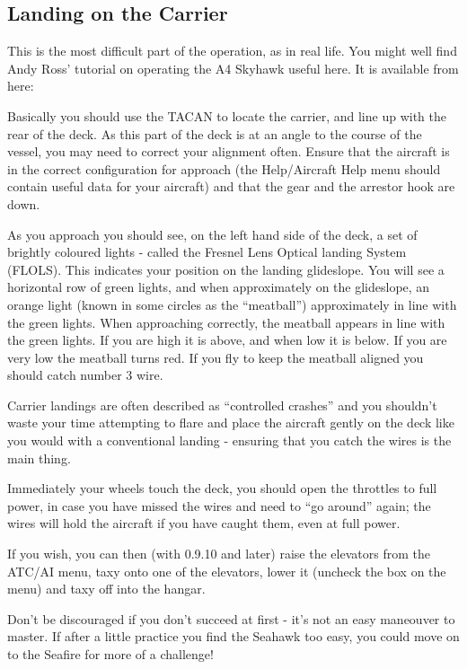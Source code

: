 \subsection{Landing on the Carrier}

This is the most difficult part of the operation, as in real life. You might well find Andy Ross' tutorial on 
operating the A4 Skyhawk useful here. It is available from here:

\noindent
{}

Basically you should use the TACAN to locate the carrier, and 
line up with the rear of the deck. As this part of the deck is at an angle to the course of the vessel, 
you may need to correct your alignment often. Ensure that the aircraft is in the correct configuration for 
approach (the Help/Aircraft Help menu should contain useful data for your aircraft) and that the gear and 
the arrestor hook are down.

As you approach you should see, on the left hand side of the deck, a set of brightly coloured lights - called 
the Fresnel Lens Optical landing System (FLOLS). This indicates your position on the landing glideslope. 
You will see a horizontal row of green lights, and when approximately on the glideslope, an orange light 
(known in some circles as the ``meatball'') approximately in line with the green lights. When approaching 
correctly, the meatball appears in line with the green lights. If you are high it is above, and when low 
it is below. If you are very low the meatball turns red. If you fly to keep the meatball aligned you 
should catch number 3 wire.

Carrier landings are often described as ``controlled crashes'' and you shouldn't waste your time attempting 
to flare and place the aircraft gently on the deck like you would with a conventional landing - ensuring that 
you catch the wires is the main thing.

Immediately your wheels touch the deck, you should open the throttles to full power, in case you have 
missed the wires and need to ``go around'' again; the wires will hold the aircraft if you have caught them, 
even at full power.

If you wish, you can then (with 0.9.10 and later) raise the elevators from the ATC/AI menu, taxy onto one of the elevators, 
lower it (uncheck the box on the menu) and taxy off into the hangar.

Don't be discouraged if you don't succeed at first - it's not an easy maneouver to master. If after a little 
practice you find the Seahawk too easy, you could move on to the Seafire for more of a challenge! 


